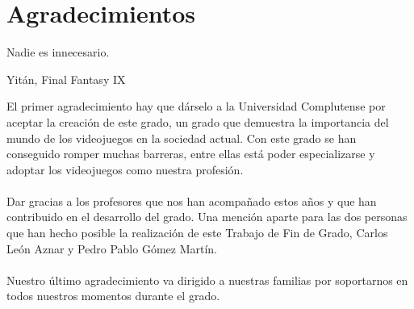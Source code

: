 %
%
%
%
%
%
%
%
%
%
%
%
%

\chapter{Agradecimientos}


\begin{FraseCelebre}
\begin{Frase}
Nadie es innecesario.
\end{Frase}
\begin{Fuente}
Yit\'an, Final Fantasy IX
\end{Fuente}
\end{FraseCelebre}

El primer agradecimiento hay que d\'arselo a la Universidad Complutense por aceptar la creaci\'on de este grado, un grado que demuestra la importancia del mundo de los videojuegos en la sociedad actual. Con este grado se han conseguido romper muchas barreras, entre ellas est\'a poder especializarse y adoptar los videojuegos como nuestra profesi\'on.
\\
\\
Dar gracias a los profesores que nos han acompa\~nado estos a\~nos y que han contribuido en el desarrollo del grado. Una menci\'on aparte para las dos personas que han hecho posible la realizaci\'on de este Trabajo de Fin de Grado, Carlos Le\'on Aznar y Pedro Pablo G\'omez Mart\'in.
\\
\\
Nuestro \'ultimo  agradecimiento va dirigido a nuestras familias por soportarnos en todos nuestros momentos durante el grado.
\\

\endinput
